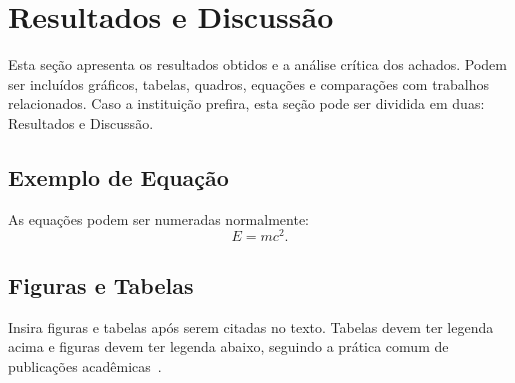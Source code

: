 \section{Resultados e Discussão}
Esta seção apresenta os resultados obtidos e a análise crítica dos achados. Podem ser incluídos gráficos, tabelas, quadros, equações e comparações com trabalhos relacionados. Caso a instituição prefira, esta seção pode ser dividida em duas: Resultados e Discussão.

\subsection{Exemplo de Equação}
As equações podem ser numeradas normalmente:
\begin{equation}
E = mc^2.
\end{equation}

\subsection{Figuras e Tabelas}
Insira figuras e tabelas após serem citadas no texto. Tabelas devem ter legenda acima e figuras devem ter legenda abaixo, seguindo a prática comum de publicações acadêmicas~\cite{ieeeconference}.